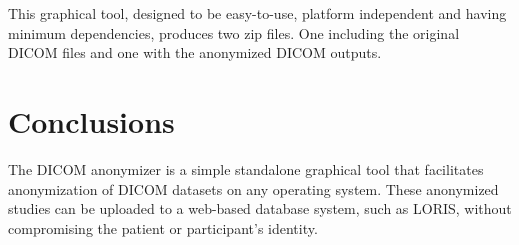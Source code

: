 \documentclass[twocolumn]{bmcart}%
\begin{document}
This graphical tool, designed to be easy-to-use, platform independent
and having minimum dependencies, produces two zip files. One including
the original DICOM files and one with the anonymized DICOM outputs.

\section{Conclusions}\label{conclusions}

The DICOM anonymizer is a simple standalone graphical tool that
facilitates anonymization of DICOM datasets on any operating system.
These anonymized studies can be uploaded to a web-based database system,
such as LORIS, without compromising the patient or participant's
identity.

\end{document}
